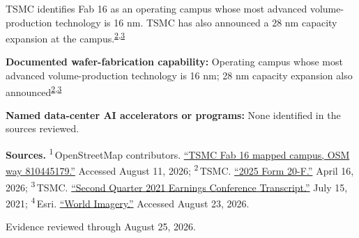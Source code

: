 \begin{minipage}[t][0.90\textheight][t]{\textwidth}
\begin{minipage}[t]{\textwidth}
\begin{minipage}[t]{0.32\textwidth}
\medskip
{\footnotesize TSMC identifies Fab 16 as an operating campus whose most advanced volume-production technology is 16 nm. TSMC has also announced a 28 nm capacity expansion at the campus.\nobreak\textsuperscript{\href{\detokenize{https://investor.tsmc.com/sites/ir/sec-filings/2025_20F}\%\detokenize{20Report.pdf}}{\textcolor{accent}{2}},\href{\detokenize{https://investor.tsmc.com/chinese/encrypt/files/encrypt_file/reports/2021-10/44ec4960f6771366a2b992ace4ae47566d7206a6/TSMC}\%\detokenize{202Q21}\%\detokenize{20transcript.pdf}}{\textcolor{accent}{3}}}\par}
\medskip
{\footnotesize\textbf{Documented wafer-fabrication capability:} Operating campus whose most advanced volume-production technology is 16 nm; 28 nm capacity expansion also announced\nobreak\textsuperscript{\href{\detokenize{https://investor.tsmc.com/sites/ir/sec-filings/2025_20F}\%\detokenize{20Report.pdf}}{\textcolor{accent}{2}},\href{\detokenize{https://investor.tsmc.com/chinese/encrypt/files/encrypt_file/reports/2021-10/44ec4960f6771366a2b992ace4ae47566d7206a6/TSMC}\%\detokenize{202Q21}\%\detokenize{20transcript.pdf}}{\textcolor{accent}{3}}}\par}
\end{minipage}
\end{minipage}
\par\vspace{0.65em}
\medskip
{\footnotesize\textbf{Named data-center AI accelerators or programs:} None identified in the sources reviewed.\par}
\medskip
{\sffamily\scriptsize\setlength{\emergencystretch}{1.5em}\textbf{Sources.} \textsuperscript{1}\,OpenStreetMap contributors. \href{\detokenize{https://www.openstreetmap.org/way/810445179}}{\enquote{TSMC Fab 16 mapped campus, OSM way 810445179.}} Accessed August 11, 2026; \textsuperscript{2}\,TSMC. \href{\detokenize{https://investor.tsmc.com/sites/ir/sec-filings/2025_20F}\%\detokenize{20Report.pdf}}{\enquote{2025 Form 20-F.}} April 16, 2026; \textsuperscript{3}\,TSMC. \href{\detokenize{https://investor.tsmc.com/chinese/encrypt/files/encrypt_file/reports/2021-10/44ec4960f6771366a2b992ace4ae47566d7206a6/TSMC}\%\detokenize{202Q21}\%\detokenize{20transcript.pdf}}{\enquote{Second Quarter 2021 Earnings Conference Transcript.}} July 15, 2021; \textsuperscript{4}\,Esri. \href{\detokenize{https://www.arcgis.com/home/item.html?id=10df2279f9684e4a9f6a7f08febac2a9}}{\enquote{World Imagery.}} Accessed August 23, 2026.\par}
\vfill
\noindent{\color{hairline}\rule{\linewidth}{0.4pt}}\par\smallskip
{\sffamily\scriptsize\color{black!58} Evidence reviewed through August 25, 2026.\par}
\end{minipage}
